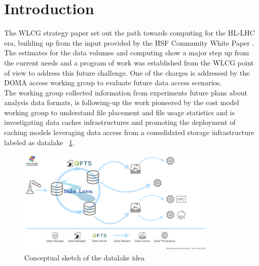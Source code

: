 \section{Introduction}
The WLCG strategy paper \cite{wlcg} set out the path towards computing for the HL-LHC era, building up from the input provided by the HSF \cite{hsf} Community White Paper \cite{cwp}.
The estimates for the data volumes and computing show a major step up from the current needs and a program of work was established from the WLCG point of view to address this future challenge. One of the charges is addressed by the DOMA access working group to evaluate future data access scenarios.\\
The working group collected information from experiments future plans about analysis data formats, is following-up the work pioneered by the cost model working group to understand file placement and file usage statistics and is investigating data caches infrastructures and promoting the deployment of caching models leveraging data access from a consolidated storage infrastructure labeled as datalake ~\ref{datalake-sketch-horizontal}.

\begin{figure}[h]
  \centering
  \includegraphics[height=5cm]{Datalake-sketch-horizontal.png}
  \caption{{\em} Conceptual sketch of the datalake idea}
  \label{datalake-sketch-horizontal}
\end{figure}



